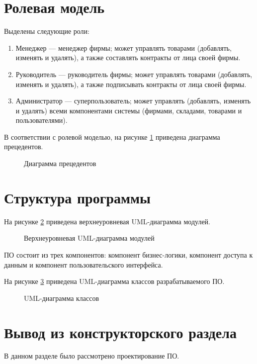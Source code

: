 \section{Ролевая модель}
Выделены следующие роли:
\begin{enumerate}
	\item Менеджер --- менеджер фирмы; может управлять товарами (добавлять, изменять и удалять), а также составлять контракты от лица своей фирмы.
	\item Руководитель --- руководитель фирмы; может управлять товарами (добавлять, изменять и удалять), а также подписывать контракты от лица своей фирмы.
	\item Администратор --- суперпользователь; может управлять (добавлять, изменять и удалять) всеми компонентами системы (фирмами, складами, товарами и пользователями).
\end{enumerate}

\clearpage
В соответствии с ролевой моделью, на рисунке \ref{use_case} приведена диаграмма прецедентов.
\begin{figure}[h!]
	\center{}
	\caption{Диаграмма прецедентов}
	\label{use_case}
\end{figure}

\clearpage
\section{Структура программы}
На рисунке \ref{up_level} приведена верхнеуровневая UML-диаграмма модулей.
\begin{figure}[h!]
	\center{}
	\caption{Верхнеуровневая UML-диаграмма модулей}
	\label{up_level}
\end{figure}
ПО состоит из трех компонентов: компонент бизнес-логики, компонент доступа к данным и компонент пользовательского интерфейса.

На рисунке \ref{uml} приведена UML-диаграмма классов разрабатываемого ПО.
\begin{figure}[h!]
	\center{}
	\caption{UML-диаграмма классов}
	\label{uml}
\end{figure}


\section{Вывод из конструкторского раздела}
В данном разделе было рассмотрено проектирование ПО.